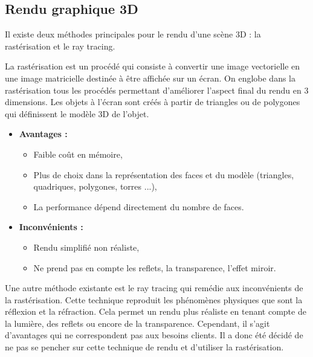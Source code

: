 \documentclass[a4paper]{article}
\begin{document}


\subsection{Rendu graphique 3D} \label{raster/ray}

Il existe deux méthodes principales pour le rendu d'une scène 3D : la rastérisation et le ray tracing.

            La rastérisation est un procédé qui consiste à convertir une image vectorielle en une image matricielle destinée à être affichée sur un écran. On englobe dans la rastérisation tous les procédés permettant d'améliorer l'aspect final du rendu en 3 dimensions.
            Les objets à l'écran sont créés à partir de triangles ou de polygones qui définissent le modèle 3D de l'objet.
            \begin{itemize}
                \item \textbf{Avantages :}
                \begin{itemize}
                    \item Faible coût en mémoire,
                    \item Plus de choix dans la représentation des faces et du modèle (triangles, quadriques, polygones, torres ...),
                    \item La performance dépend directement du nombre de faces.
                \end{itemize}
                \item  \textbf{Inconvénients :}
                \begin{itemize}
                    \item Rendu simplifié non réaliste,
                    \item Ne prend pas en compte les reflets, la transparence, l'effet miroir.
                \end{itemize}
            \end{itemize}
        
Une autre méthode existante est le ray tracing qui remédie aux inconvénients de la rastérisation. Cette technique reproduit les phénomènes physiques que sont la réflexion et la réfraction. Cela permet un rendu plus réaliste en tenant compte de la lumière, des reflets ou encore de la transparence. Cependant, il s'agit d'avantages qui ne correspondent pas aux besoins clients. Il a donc été décidé de ne pas se pencher sur cette technique de rendu et d'utiliser la rastérisation.
        
\end{document}
